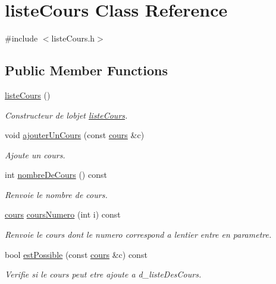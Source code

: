 \hypertarget{classliste_cours}{}\section{liste\+Cours Class Reference}
\label{classliste_cours}


{\ttfamily \#include $<$liste\+Cours.\+h$>$}

\subsection*{Public Member Functions}
\begin{DoxyCompactItemize}
\item 
\hyperlink{classliste_cours_af5a10a6e898373e43355b8a29dc20b83}{liste\+Cours} ()
\begin{DoxyCompactList}\small\item\em Constructeur de l\textquotesingle{}objet \hyperlink{classliste_cours}{liste\+Cours}. \end{DoxyCompactList}\item 
void \hyperlink{classliste_cours_aacc38305cfea76d8cc77d710d144ce8b}{ajouter\+Un\+Cours} (const \hyperlink{classcours}{cours} \&c)
\begin{DoxyCompactList}\small\item\em Ajoute un cours. \end{DoxyCompactList}\item 
int \hyperlink{classliste_cours_a34b859c2380770eb560c0a6dcf01cc81}{nombre\+De\+Cours} () const
\begin{DoxyCompactList}\small\item\em Renvoie le nombre de cours. \end{DoxyCompactList}\item 
\hyperlink{classcours}{cours} \hyperlink{classliste_cours_ac00615f15632669bf44424e960c95edd}{cours\+Numero} (int i) const
\begin{DoxyCompactList}\small\item\em Renvoie le cours dont le numero correspond a l\textquotesingle{}entier entre en parametre. \end{DoxyCompactList}\item 
bool \hyperlink{classliste_cours_ab66777592d4693d8db47e756dfe61878}{est\+Possible} (const \hyperlink{classcours}{cours} \&c) const
\begin{DoxyCompactList}\small\item\em Verifie si le cours peut etre ajoute a d\+\_\+liste\+Des\+Cours. \end{DoxyCompactList}\end{DoxyCompactItemize}


